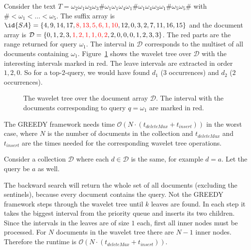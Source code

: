 \begin{Example}
  Consider the text $T = \omega_2\omega_1\omega_3\omega_3\#\omega_1\omega_1\omega_4\omega_1\#\omega_1\omega_4\omega_3\omega_1\#\omega_5\omega_5\#$ with $\# < \omega_1 < \ldots < \omega_5$. The suffix array is $\id{SA} = \{4,9,14,17,{\color{red}8,13,5,6,1,10},12,0,3,2,7,11,16,15\}$ and the document array is $\mathcal{D} = \{0,1,2,3,{\color{red}1,2,1,1,0,2},2,0,0,0,1,2,3,3\}$. The red parts are the range  returned for query $\omega_1$. The interval in $\mathcal{D}$ corresponds to the multiset of all documents containing $\omega_1$. Figure~\ref{fig:greedyWaveletTree} shows the wavelet tree over $\mathcal{D}$ with the interesting intervals marked in red. The leave intervals are extracted in order $1,2,0$. So for a top-$2$-query, we would have found $d_1$ ($3$ occurrences) and $d_2$ ($2$ occurrences).

  \begin{figure}[htb]
    \centering
    
    \caption{The wavelet tree over the document array $\mathcal{D}$. The interval with the documents corresponding to query $q = \omega_1$ are marked in red.}
    \label{fig:greedyWaveletTree}
  \end{figure}
\end{Example}

\begin{Theorem}
  The GREEDY framework needs time $\mathcal{O}(N \cdot(t_{deleteMax} + t_{insert}))$ in the worst case, where $N$ is the number of documents in the collection and $t_{deleteMax}$ and $t_{insert}$ are the times needed for the corresponding wavelet tree operations.
\end{Theorem}

\begin{Proof}
  Consider a collection $\mathcal{D}$ where each $d \in \mathcal{D}$ is the same, for example $d = a$. Let the query be $a$ as well.

  The backward search will return the whole set of all documents (excluding the sentinels), because every document contains the query. Not the GREEDY framework steps through the wavelet tree until $k$ leaves are found. In each step it takes the biggest interval from the priority queue and inserts its two children. Since the intervals in the leaves are of size $1$ each, first all inner nodes must be processed. For $N$ documents in the wavelet tree there are $N-1$ inner nodes. Therefore the runtime is $\mathcal{O}(N \cdot(t_{deleteMax} + t_{insert}))$.
\end{Proof}
